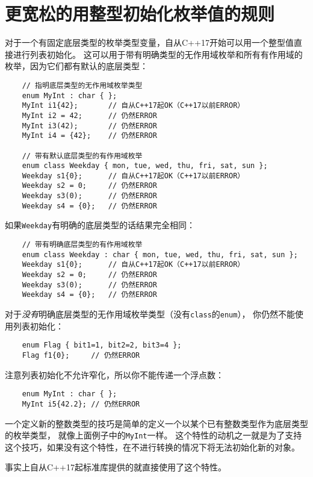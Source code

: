\section{更宽松的用整型初始化枚举值的规则}\label{ch8.3}
对于一个有固定底层类型的枚举类型变量，自从C++17开始可以用一个整型值直接进行列表初始化。
这可以用于带有明确类型的无作用域枚举和所有有作用域的枚举，因为它们都有默认的底层类型：
\begin{lstlisting}
    // 指明底层类型的无作用域枚举类型
    enum MyInt : char { };
    MyInt i1{42};       // 自从C++17起OK（C++17以前ERROR）
    MyInt i2 = 42;      // 仍然ERROR
    MyInt i3(42);       // 仍然ERROR
    MyInt i4 = {42};    // 仍然ERROR

    // 带有默认底层类型的有作用域枚举
    enum class Weekday { mon, tue, wed, thu, fri, sat, sun };
    Weekday s1{0};      // 自从C++17起OK（C++17以前ERROR）
    Weekday s2 = 0;     // 仍然ERROR
    Weekday s3(0);      // 仍然ERROR
    Weekday s4 = {0};   // 仍然ERROR
\end{lstlisting}
如果\texttt{Weekday}有明确的底层类型的话结果完全相同：
\begin{lstlisting}
    // 带有明确底层类型的有作用域枚举
    enum class Weekday : char { mon, tue, wed, thu, fri, sat, sun };
    Weekday s1{0};      // 自从C++17起OK（C++17以前ERROR）
    Weekday s2 = 0;     // 仍然ERROR
    Weekday s3(0);      // 仍然ERROR
    Weekday s4 = {0};   // 仍然ERROR
\end{lstlisting}
对于\emph{没有}明确底层类型的无作用域枚举类型（没有\texttt{class}的\texttt{enum}），
你仍然不能使用列表初始化：
\begin{lstlisting}
    enum Flag { bit1=1, bit2=2, bit3=4 };
    Flag f1{0};     // 仍然ERROR
\end{lstlisting}
注意列表初始化不允许窄化，所以你不能传递一个浮点数：
\begin{lstlisting}
    enum MyInt : char { };
    MyInt i5{42.2}; // 仍然ERROR
\end{lstlisting}
一个定义新的整数类型的技巧是简单的定义一个以某个已有整数类型作为底层类型的枚举类型，
就像上面例子中的\texttt{MyInt}一样。
这个特性的动机之一就是为了支持这个技巧，如果没有这个特性，在不进行转换的情况下将无法初始化新的对象。

事实上自从C++17起标准库提供的就直接使用了这个特性。

